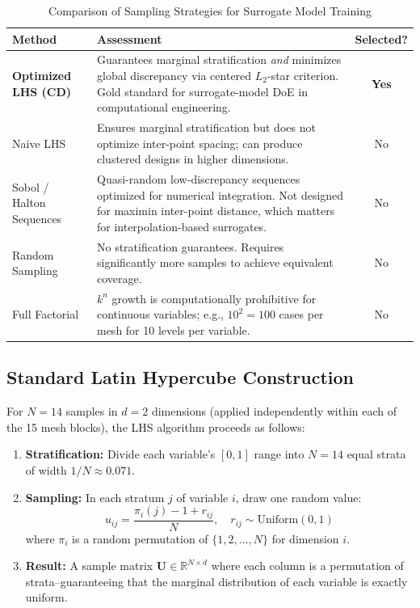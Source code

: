 \documentclass[12pt, a4paper]{report}
\begin{document}
\begin{table}[H]
\centering
\caption{Comparison of Sampling Strategies for Surrogate Model Training}
\label{tab:lhs_comparison}
\begin{tabular}{@{}lp{8cm}c@{}}
\toprule
\textbf{Method} & \textbf{Assessment} & \textbf{Selected?} \\ \midrule
\textbf{Optimized LHS (CD)} & Guarantees marginal stratification \textit{and} minimizes global discrepancy via centered $L_2$-star criterion. Gold standard for surrogate-model DoE in computational engineering. & \textbf{Yes} \\
Naive LHS & Ensures marginal stratification but does not optimize inter-point spacing; can produce clustered designs in higher dimensions. & No \\
Sobol / Halton Sequences & Quasi-random low-discrepancy sequences optimized for numerical integration. Not designed for maximin inter-point distance, which matters for interpolation-based surrogates. & No \\
Random Sampling & No stratification guarantees. Requires significantly more samples to achieve equivalent coverage. & No \\
Full Factorial & $k^n$ growth is computationally prohibitive for continuous variables; e.g., $10^2 = 100$ cases per mesh for 10 levels per variable. & No \\
\bottomrule
\end{tabular}
\end{table}

\subsection{Standard Latin Hypercube Construction}
For $N = 14$ samples in $d = 2$ dimensions (applied independently within each of the 15 mesh blocks), the LHS algorithm proceeds as follows:

\begin{enumerate}
    \item \textbf{Stratification:} Divide each variable's $[0, 1]$ range into $N = 14$ equal strata of width $1/N \approx 0.071$.
    \item \textbf{Sampling:} In each stratum $j$ of variable $i$, draw one random value:
    \begin{equation}
        u_{ij} = \frac{\pi_{i}(j) - 1 + r_{ij}}{N}, \quad r_{ij} \sim \text{Uniform}(0, 1)
    \end{equation}
    where $\pi_i$ is a random permutation of $\{1, 2, \ldots, N\}$ for dimension $i$.
    \item \textbf{Result:} A sample matrix $\mathbf{U} \in \mathbb{R}^{N \times d}$ where each column is a permutation of strata--guaranteeing that the marginal distribution of each variable is exactly uniform.
\end{enumerate}
\end{document}
